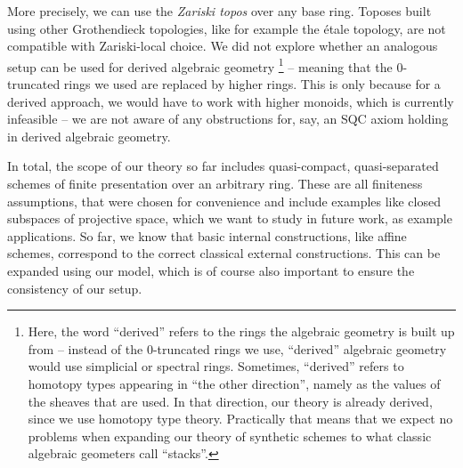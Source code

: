 More precisely, we can use the \emph{Zariski topos} over any base ring.
Toposes built using other Grothendieck topologies, like for example the étale topology, are not compatible with Zariski-local choice.
We did not explore whether an analogous setup can be used for derived algebraic geometry%
\footnote{Here, the word ``derived'' refers to the rings the algebraic geometry is built up from --
  instead of the 0-truncated rings we use, ``derived'' algebraic geometry would use simplicial or spectral rings.
  Sometimes, ``derived'' refers to homotopy types appearing in ``the other direction'', namely as the values of the sheaves that are used.
  In that direction, our theory is already derived, since we use homotopy type theory.
  Practically that means that we expect no problems when expanding our theory of synthetic schemes to what classic algebraic geometers
  call ``stacks''.
}
-- meaning that the 0-truncated rings we used are replaced by higher rings.
This is only because for a derived approach, we would have to work with higher monoids, which is currently infeasible
-- we are not aware of any obstructions for, say, an SQC axiom holding in derived algebraic geometry.

In total, the scope of our theory so far includes quasi-compact, quasi-separated schemes of finite presentation over an arbitrary ring.
These are all finiteness assumptions, that were chosen for convenience and include examples like closed subspaces of projective space,
which we want to study in future work, as example applications.
So far, we know that basic internal constructions, like affine schemes, correspond to the correct classical external constructions.
This can be expanded using our model, which is of course also important to ensure the consistency of our setup.
